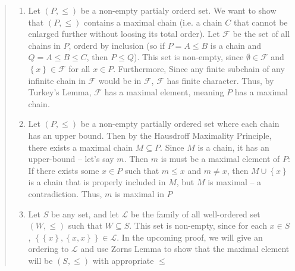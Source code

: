 \documentclass[oneside]{book}
\newcommand{\CF}{\mathcal{F}}
\newcommand{\CG}{\mathcal{G}}
\newcommand{\CH}{\mathcal{H}}
\newcommand{\CL}{\mathcal{L}}
\newcommand{\ff}{\mathscr{F}}
\newcommand{\sse}{\subseteq}
\newcommand{\ssne}{\subsetneq}
\newcommand{\Rw}{\Rightarrow}
\begin{document}
\begin{Proof}
\begin{quote}
\begin{enumerate}
				Finally, we get to combine all these facts. If $A \in \ff_0 = \CH$ and $B \in \ff_0 = \CG_A$, then
				either $B \sse A$ or $A \sse f(A) \sse B$. We couldn't do this earlier since we didn't know that $\ff_0
				= \CH$ and $\ff_0 = \CG_F$ for any $F \in \ff_0$. Thus, we have that $A \sse B$ or $B \sse A$, showing
				that $\ff_0$ is a chain. We can now define $M = \cup \ff_0$. Since $\ff_0$ is $f$-inductive, then by the
				3rd condition $M \in \ff_0$. By the 2nd condition:
				\[
					\cup \ff_0 = M \ssne f(M) \in \ff_0
				\]
				But $f(M) \sse \cup \ff_0 = M$, so $M \ssne f(M) \sse M$ implying $M \ssne M$ -- a contradiction. The
				source of the contradiction was assuming an $f$ existed which let's as choose an ever bigger value, and
				so no such function can exist, meaning for some $A$, there does not exist a $B$ such that $A \ssne B$,
				but then $A$ is maximal. And so, we have that $(1) \Rw (2)$
			\item[$(2) \Rw (3)$] Let $(P, \le)$ be a non-empty partialy orderd set. We want to show that $(P, \le)$
				contains a maximal chain (i.e. a chain $C$ that cannot be enlarged further without loosing its total
				order). Let $\CF$ be the set of all
				chains in $P$, orderd by inclusion (so if $P = A \le B$ is a chain and $Q = A \le B \le C$, then $P \le
				Q$). This set is non-empty, since $\emptyset \in \CF$ and $ \left\{ x \right\} \in \CF$ for
				all $x \in P$. Furthermore, Since any finite subchain of any infinite chain in $\CF$ would be in $\CF$,
				$\CF$ has finite character. Thus, by Turkey's Lemma, $\CF$ has a maximal element, meaning $P$ has
				a maximal chain.
			\item[$(3) \Rw (4)$] Let $(P, \le)$ be a non-empty partially ordered set where each chain has an upper
				bound. Then by the Hausdroff Maximality Principle, there exists a maximal chain $M \sse P$. Since $M$ is
				a chain, it has an upper-bound -- let's say $m$. Then $m$ is must be a maximal element of $P$: If there
				exists some $x \in P$ such that $m \le x$ and $m \ne x$, then $M\cup \left\{ x \right\}$ is a chain that
				is properly included in $M$, but $M$ is maximal -- a contradiction. Thus, $m$ is maximal in $P$
			\item[$(4) \Rw (5)$] Let $S$ be any set, and let $\CL$ be the family of all well-ordered set $(W, \le)$ such
				that $W \sse S$. This set is non-empty, since for each $x \in S$, $ \left\{ \left\{ x \right\}, \left\{
				x,x\right\} \right\} \in \CL$. In the upcoming proof, we will give an ordering to $\CL$ and use Zorns
				Lemma to show that the maximal element will be $(S, \le)$ with appropriate $\le$


\end{enumerate}
\end{quote}
\end{Proof}
\end{document}
